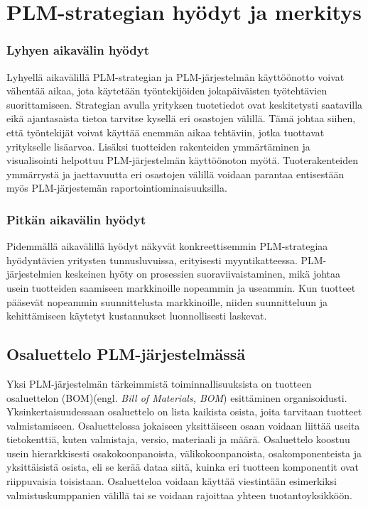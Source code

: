\section{PLM-strategian hyödyt ja merkitys} \label{PLM-strategian hyödyt ja merkitys}


\subsubsection{Lyhyen aikavälin hyödyt} \label{Lyhyen aikavälin hyödyt}

Lyhyellä aikavälillä PLM-strategian ja PLM-järjestelmän käyttöönotto voivat vähentää aikaa, jota käytetään työntekijöiden jokapäiväisten työtehtävien suorittamiseen. Strategian avulla yrityksen tuotetiedot ovat keskitetysti saatavilla eikä ajantasaista tietoa tarvitse kysellä eri osastojen välillä. Tämä johtaa siihen, että työntekijät voivat käyttää enemmän aikaa tehtäviin, jotka tuottavat yritykselle lisäarvoa. Lisäksi tuotteiden rakenteiden ymmärtäminen ja visualisointi helpottuu PLM-järjestelmän käyttöönoton myötä. Tuoterakenteiden ymmärrystä ja jaettavuutta eri osastojen välillä voidaan parantaa entisestään myös PLM-järjestemän raportointiominaisuuksilla.  \cite{alemanni_key_2008}

\subsubsection{Pitkän aikavälin hyödyt} \label{Pitkän aikavälin hyödyt}

Pidemmällä aikavälillä hyödyt näkyvät konkreettisemmin PLM-strategiaa hyödyntävien yritysten tunnusluvuissa, erityisesti myyntikatteessa. PLM-järjestelmien keskeinen hyöty on prosessien suoraviivaistaminen, mikä johtaa usein tuotteiden saamiseen markkinoille nopeammin ja useammin. Kun tuotteet pääsevät nopeammin suunnittelusta markkinoille, niiden suunnitteluun ja kehittämiseen käytetyt kustannukset luonnollisesti laskevat.  \cite{bouhaddou_plm_2012}  \cite{alemanni_key_2008}

\subsection{Osaluettelo PLM-järjestelmässä} \label{Osaluettelo PLM-järjestelmässä}

Yksi PLM-järjestelmän tärkeimmistä toiminnallisuuksista on tuotteen osaluettelon (BOM)(engl. \textit{Bill of Materials, BOM}) esittäminen organisoidusti.\cite{david_what_2016} Yksinkertaisuudessaan osaluettelo on lista kaikista osista, joita tarvitaan tuotteet valmistamiseen. Osaluettelossa jokaiseen yksittäiseen osaan voidaan liittää useita tietokenttiä, kuten valmistaja, versio, materiaali ja määrä. Osaluettelo koostuu usein hierarkkisesti osakokoonpanoista, välikokoonpanoista, osakomponenteista ja yksittäisistä osista, eli se kerää dataa siitä, kuinka eri tuotteen komponentit ovat riippuvaisia toisistaan. Osaluetteloa voidaan käyttää viestintään esimerkiksi valmistuskumppanien välillä tai se voidaan rajoittaa yhteen tuotantoyksikköön.  \cite{jones_visualizing_2023}

